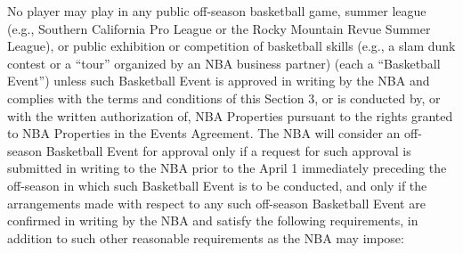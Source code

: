 \documentclass[
]{book}
\begin{document}
No player may play in any public off-season basketball game, summer league (e.g., Southern California Pro League or the Rocky Mountain Revue Summer League), or public exhibition or competition of basketball skills (e.g., a slam dunk contest or a ``tour'' organized by an NBA business partner) (each a ``Basketball Event'') unless such Basketball Event is approved in writing by the NBA and complies with the terms and conditions of this Section 3, or is conducted by, or with the written authorization of, NBA Properties pursuant to the rights granted to NBA Properties in the Events Agreement. The NBA will consider an off-season Basketball Event for approval only if a request for such approval is submitted in writing to the NBA prior to the April 1 immediately preceding the off-season in which such Basketball Event is to be conducted, and only if the arrangements made with respect to any such off-season Basketball Event are confirmed in writing by the NBA and satisfy the following requirements, in addition to such other reasonable requirements as the NBA may impose:
\end{document}
